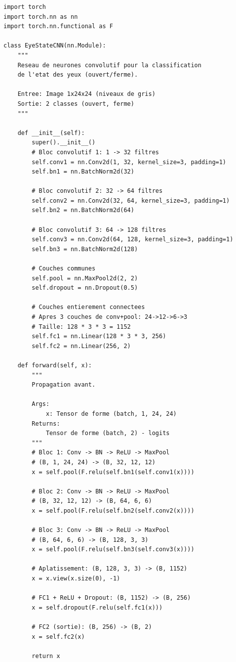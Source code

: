 \begin{lstlisting}[style=pythonstyle, caption={Architecture complète du EyeStateCNN.}, label={lst:eye_cnn}]
import torch
import torch.nn as nn
import torch.nn.functional as F

class EyeStateCNN(nn.Module):
    """
    Reseau de neurones convolutif pour la classification
    de l'etat des yeux (ouvert/ferme).
    
    Entree: Image 1x24x24 (niveaux de gris)
    Sortie: 2 classes (ouvert, ferme)
    """
    
    def __init__(self):
        super().__init__()
        # Bloc convolutif 1: 1 -> 32 filtres
        self.conv1 = nn.Conv2d(1, 32, kernel_size=3, padding=1)
        self.bn1 = nn.BatchNorm2d(32)
        
        # Bloc convolutif 2: 32 -> 64 filtres
        self.conv2 = nn.Conv2d(32, 64, kernel_size=3, padding=1)
        self.bn2 = nn.BatchNorm2d(64)
        
        # Bloc convolutif 3: 64 -> 128 filtres
        self.conv3 = nn.Conv2d(64, 128, kernel_size=3, padding=1)
        self.bn3 = nn.BatchNorm2d(128)
        
        # Couches communes
        self.pool = nn.MaxPool2d(2, 2)
        self.dropout = nn.Dropout(0.5)
        
        # Couches entierement connectees
        # Apres 3 couches de conv+pool: 24->12->6->3
        # Taille: 128 * 3 * 3 = 1152
        self.fc1 = nn.Linear(128 * 3 * 3, 256)
        self.fc2 = nn.Linear(256, 2)
    
    def forward(self, x):
        """
        Propagation avant.
        
        Args:
            x: Tensor de forme (batch, 1, 24, 24)
        Returns:
            Tensor de forme (batch, 2) - logits
        """
        # Bloc 1: Conv -> BN -> ReLU -> MaxPool
        # (B, 1, 24, 24) -> (B, 32, 12, 12)
        x = self.pool(F.relu(self.bn1(self.conv1(x))))
        
        # Bloc 2: Conv -> BN -> ReLU -> MaxPool
        # (B, 32, 12, 12) -> (B, 64, 6, 6)
        x = self.pool(F.relu(self.bn2(self.conv2(x))))
        
        # Bloc 3: Conv -> BN -> ReLU -> MaxPool
        # (B, 64, 6, 6) -> (B, 128, 3, 3)
        x = self.pool(F.relu(self.bn3(self.conv3(x))))
        
        # Aplatissement: (B, 128, 3, 3) -> (B, 1152)
        x = x.view(x.size(0), -1)
        
        # FC1 + ReLU + Dropout: (B, 1152) -> (B, 256)
        x = self.dropout(F.relu(self.fc1(x)))
        
        # FC2 (sortie): (B, 256) -> (B, 2)
        x = self.fc2(x)
        
        return x
\end{lstlisting}

